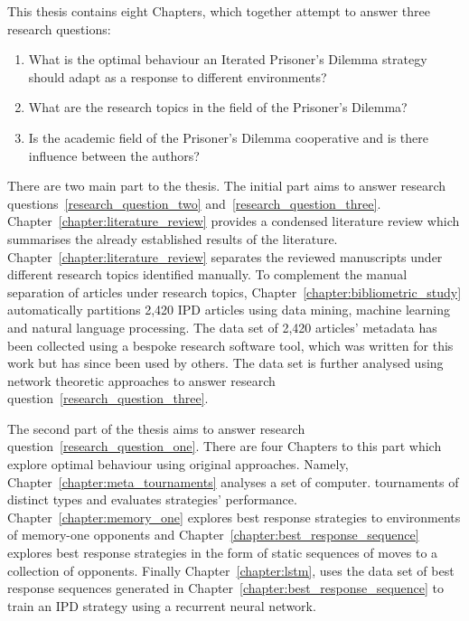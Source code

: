 This thesis contains eight Chapters, which together attempt to answer three research
questions:

\begin{enumerate}
    \item What is the optimal behaviour an Iterated Prisoner's Dilemma strategy should adapt as a response to different
 environments?\label{research_question_one}
    \item What are the research topics in the field of the Prisoner's Dilemma?\label{research_question_two}
    \item Is the academic field of the Prisoner's Dilemma cooperative and is there
    influence between the authors?\label{research_question_three}
\end{enumerate}

There are two main part to the thesis. The initial part aims to answer research
questions~\ref{research_question_two} and~\ref{research_question_three}.
Chapter~\ref{chapter:literature_review} provides a condensed
literature review which summarises the already established results of the
literature. Chapter~\ref{chapter:literature_review} separates the reviewed manuscripts
under different research topics identified manually. To complement the manual
separation of articles under research topics,
Chapter~\ref{chapter:bibliometric_study} automatically partitions 2,420 IPD
articles using data mining, machine learning and  natural language processing. The data set of 2,420 articles' metadata has
been collected using a bespoke research software tool, which was written for this work but has since been used by others. The data set is further
analysed using network theoretic approaches to answer research question~\ref{research_question_three}.

The second part of the thesis aims to answer research
question~\ref{research_question_one}. There are four Chapters to this part which
explore optimal behaviour using original approaches. Namely,
Chapter~\ref{chapter:meta_tournaments} analyses a set of \numberofalltournaments computer.
tournaments of distinct types and evaluates \numberofstrategies strategies'
performance. Chapter~\ref{chapter:memory_one} explores best response strategies
to environments of memory-one opponents and
Chapter~\ref{chapter:best_response_sequence} explores best response strategies
in the form of static sequences of moves to a collection of opponents. Finally
Chapter~\ref{chapter:lstm}, uses the data set of best response sequences
generated in Chapter~\ref{chapter:best_response_sequence} to train an IPD
strategy using a recurrent neural network.

